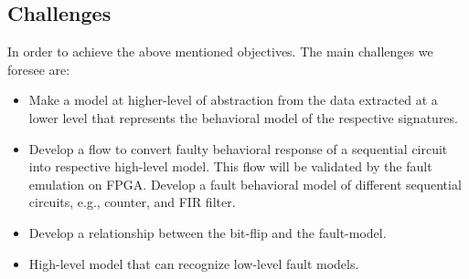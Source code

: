 \begin{itemize}
%
%
%
%
%


\end{itemize}


\subsection{Challenges}
In order to achieve the above mentioned objectives. The main challenges we foresee are:
\begin{itemize}
\item Make a model at higher-level of abstraction from the data extracted at a lower level that represents the behavioral model of the respective signatures.
\item Develop a flow to convert faulty behavioral response of a sequential circuit into respective high-level model. This flow will be validated by the fault emulation on FPGA. Develop a  fault behavioral model of different sequential circuits, e.g., counter, and FIR filter.
\item Develop a relationship between the bit-flip and the fault-model.
\item High-level model that can recognize low-level fault models.
\end{itemize}

